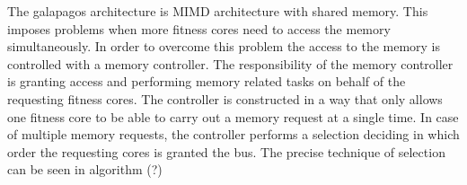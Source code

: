 The galapagos architecture is MIMD architecture with shared memory. This imposes problems when more fitness cores need to access the memory simultaneously. In order to overcome this problem the access to the memory is controlled with a memory controller. The responsibility of the memory controller is granting access and performing memory related tasks on behalf of the requesting fitness cores. The controller is constructed in a way that only allows one fitness core to be able to carry out a memory request at a single time. In case of multiple memory requests, the controller performs a selection deciding in which order the requesting cores is granted the bus. The precise technique of selection can be seen in algorithm (?)





